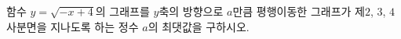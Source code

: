 \hspace*{2mm}\begin{minipage}[t]{\dimexpr\linewidth-2mm\relax}\vspace{0pt}
함수 $y=\sqrt{-x+4}$의 그래프를 $y$축의 방향으로 $a$만큼 평행이동한 그래프가 제$2$, $3$, $4$사분면을 지나도록 하는 정수 $a$의 최댓값을 구하시오.\end{minipage}
